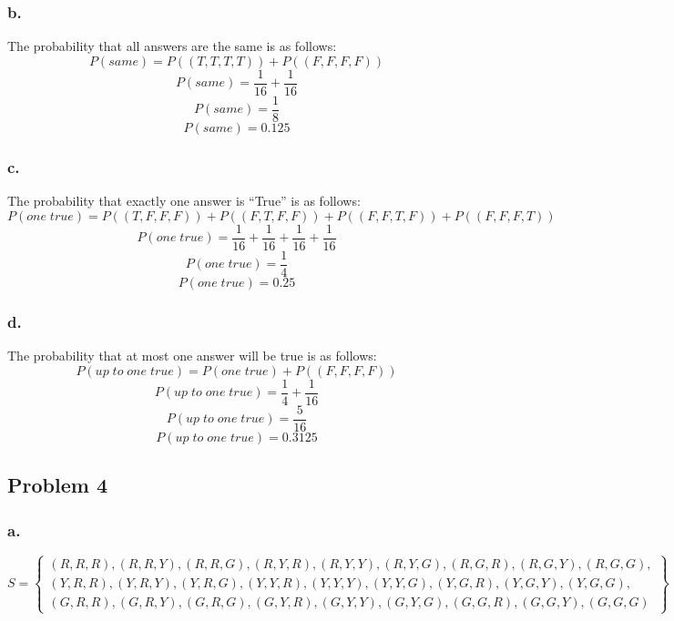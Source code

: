 \documentclass[11pt]{article}
\begin{document}
\subsubsection*{b.}
The probability that all answers are the same is as follows:
\[ P(same) = P\left( \left( T, T, T, T \right) \right) + 
             P\left( \left( F, F, F, F \right) \right)
\]
\[ P(same) = \frac{1}{16} + \frac{1}{16} \]
\[ P(same) = \frac{1}{8} \]
\[ P(same) = 0.125 \]

\subsubsection*{c.}
The probability that exactly one answer is ``True'' is as follows:
\[ P(one\;true) = P((T, F, F, F)) +
                 P((F, T, F, F)) +
                 P((F, F, T, F)) +
                 P((F, F, F, T))
\]
\[ P(one\;true) = \frac{1}{16} + \frac{1}{16} + \frac{1}{16} + \frac{1}{16} \]
\[ P(one\;true) = \frac{1}{4} \]
\[ P(one\;true) = 0.25 \]

\subsubsection*{d.}
The probability that at most one answer will be true is as follows:
\[ P(up\;to\;one\;true) = P(one\;true) + P((F, F, F, F)) \]
\[ P(up\;to\;one\;true) = \frac{1}{4} + \frac{1}{16} \] 
\[ P(up\;to\;one\;true) = \frac{5}{16} \] 
\[ P(up\;to\;one\;true) = 0.3125 \]

\subsection*{Problem 4}
\subsubsection*{a.}
\[ S = \left\{ 
    \begin{array}{c}
        \left( R, R, R \right),
        \left( R, R, Y \right),
        \left( R, R, G \right),
        \left( R, Y, R \right),
        \left( R, Y, Y \right),
        \left( R, Y, G \right),
        \left( R, G, R \right),
        \left( R, G, Y \right),
        \left( R, G, G \right), \\
        \left( Y, R, R \right),
        \left( Y, R, Y \right),
        \left( Y, R, G \right),
        \left( Y, Y, R \right),
        \left( Y, Y, Y \right),
        \left( Y, Y, G \right),
        \left( Y, G, R \right),
        \left( Y, G, Y \right),
        \left( Y, G, G \right), \\
        \left( G, R, R \right),
        \left( G, R, Y \right),
        \left( G, R, G \right),
        \left( G, Y, R \right),
        \left( G, Y, Y \right),
        \left( G, Y, G \right),
        \left( G, G, R \right),
        \left( G, G, Y \right),
        \left( G, G, G \right)
    \end{array}
\right\} \]
\end{document}
